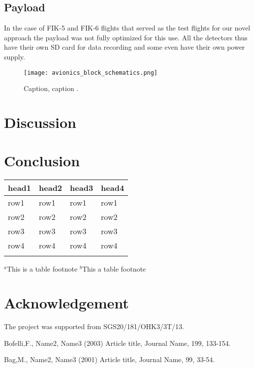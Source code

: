 \documentclass{Rpd}
\begin{document}
\subsection{Payload}
In the case of FIK-5 and FIK-6 flights that served as the test flights for our novel approach the payload was not fully optimized for this use. All the detectors thus have their own SD card for data recording and some even have their own power supply.


%
%


\begin{figure}%
\texttt{[image: avionics\_block\_schematics.png]}
\caption{Caption, caption \label{fig:02}.}
\end{figure}


\section{Discussion}




\section{Conclusion}




\begin{table}[t]
{\begin{tabular}{llll}\toprule
head1 & head2 & head3 & head4\\\midrule
row1 & row1 & row1 & row1\\
row2 & row2 & row2 & row2\\
row3 & row3 & row3 & row3\\
row4 & row4 & row4 & row4\\\botrule
\end{tabular}}{$^a$This is a table footnote\newline
$^b$This a table footnote}
\end{table}


\section*{Acknowledgement}
The project was supported from  SGS20/181/OHK3/3T/13.

\begin{thebibliography}{99.}%
 Bofelli,F., Name2, Name3 (2003) Article title, { Journal Name}, { 199}, 133-154.

 Bag,M., Name2, Name3 (2001) Article title, { Journal Name}, { 99}, 33-54.

\end{thebibliography}
\end{document}
